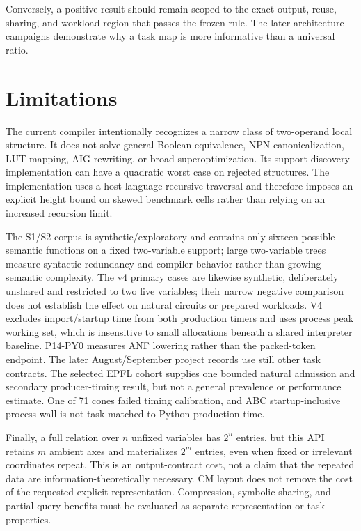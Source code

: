 \documentclass[10pt]{article}
\theoremstyle{plain}
\theoremstyle{definition}
\theoremstyle{remark}
\begin{document}
Conversely, a positive result should remain scoped to the exact output, reuse, sharing, and workload region that passes the frozen rule. The later architecture campaigns demonstrate why a task map is more informative than a universal ratio.

\section{Limitations}

The current compiler intentionally recognizes a narrow class of two-operand local structure. It does not solve general Boolean equivalence, NPN canonicalization, LUT mapping, AIG rewriting, or broad superoptimization. Its support-discovery implementation can have a quadratic worst case on rejected structures. The implementation uses a host-language recursive traversal and therefore imposes an explicit height bound on skewed benchmark cells rather than relying on an increased recursion limit.

The S1/S2 corpus is synthetic/exploratory and contains only sixteen possible semantic functions on a fixed two-variable support; large two-variable trees measure syntactic redundancy and compiler behavior rather than growing semantic complexity. The v4 primary cases are likewise synthetic, deliberately unshared and restricted to two live variables; their narrow negative comparison does not establish the effect on natural circuits or prepared workloads. V4 excludes import/startup time from both production timers and uses process peak working set, which is insensitive to small allocations beneath a shared interpreter baseline. P14-PY0 measures ANF lowering rather than the packed-token endpoint. The later August/September project records use still other task contracts. The selected EPFL cohort supplies one bounded natural admission and secondary producer-timing result, but not a general prevalence or performance estimate. One of 71 cones failed timing calibration, and ABC startup-inclusive process wall is not task-matched to Python production time.

Finally, a full relation over $n$ unfixed variables has $2^n$ entries, but this API retains $m$ ambient axes and materializes $2^m$ entries, even when fixed or irrelevant coordinates repeat. This is an output-contract cost, not a claim that the repeated data are information-theoretically necessary. CM layout does not remove the cost of the requested explicit representation. Compression, symbolic sharing, and partial-query benefits must be evaluated as separate representation or task properties.
\end{document}
